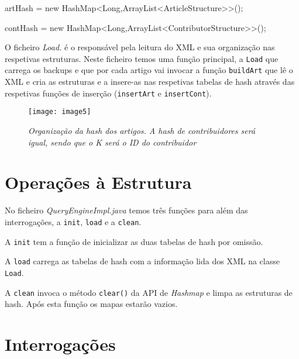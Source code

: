 \documentclass[a4paper,12pt]{report}
\begin{document}
\begin{tcolorbox}[width=\textwidth,colback={darkgray},title={\sf Excerto 2.5: Criar tabelas de hash.},outer arc=2mm,colupper=white]    
	{\footnotesize\ttfamily 
		
	artHash {\color{brightpink}= new} {\color{lightblue}HashMap<Long,ArrayList<ArticleStructure>>}();
	
	contHash {\color{brightpink}= new} {\color{lightblue}HashMap<Long,ArrayList<ContributorStructure>>}();
		\
	}
\end{tcolorbox} 

O ficheiro {\sl Load.} é o responsável pela leitura do XML e sua organização nas respetivas estruturas. Neste ficheiro temos uma função principal, a {\tt Load} que carrega os backups e que por cada artigo vai invocar a função {\tt buildArt} que lê o XML e cria as estruturas e a insere-as nas respetivas tabelas de hash através das respetivas funções de inserção ({\tt insertArt} e {\tt insertCont}).

\begin{figure}[h]
	\centering
	\texttt{[image: image5]}
	\caption{\small\sl Organização da hash dos artigos. A hash de contribuidores será igual, sendo que o {\sl K} será o ID do contribuidor}
	\captionsetup[figure]{list=yes}
\end{figure}

\section{Operações à Estrutura}

No ficheiro {\sl QueryEngineImpl.java} temos três funções para além das interrogações, a {\tt init}, {\tt load} e a {\tt clean}.

A {\tt init} tem a função de inicializar as duas tabelas de hash por omissão.

A {\tt load} carrega as tabelas de hash com a informação lida dos XML na classe {\tt Load}.

A {\tt clean} invoca o método {\tt clear()} da API de {\sl Hashmap} e limpa as estruturas de hash. Após esta função os mapas estarão vazios.

\section{Interrogações}
\end{document}
